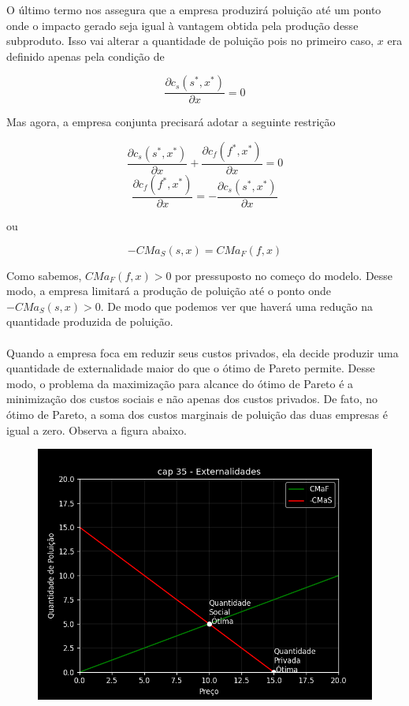 \documentclass[a4paper,11pt,oneside]{book}
\theoremstyle{definition}
\theoremstyle{break}
\begin{document}
O último termo nos assegura que a empresa produzirá poluição até um ponto onde o impacto gerado seja igual à vantagem obtida pela produção desse subproduto. Isso vai alterar a quantidade de poluição pois no primeiro caso, $x$ era definido apenas pela condição de 

$$ \frac{\partial c_s(s^*,x^*)}{\partial x} = 0 $$

Mas agora, a empresa conjunta precisará adotar a seguinte restrição

$$ \frac{\partial c_s(s^*,x^*)}{\partial x} + \frac{\partial c_f(f^*,x^*)}{\partial x}= 0 $$
$$\frac{\partial c_f(f^*,x^*)}{\partial x} = - \frac{\partial c_s(s^*,x^*)}{\partial x} $$

\begin{center}
	ou
\end{center}

$$ - CMa_S(s,x) = CMa_F(f,x) $$

Como sabemos, $CMa_F(f,x) > 0$ por pressuposto no começo do modelo. Desse modo, a empresa limitará a produção de poluição até o ponto onde $- CMa_S(s,x) > 0$. De modo que podemos ver que haverá uma redução na quantidade produzida de poluição.
\\
\\
Quando a empresa foca em reduzir seus custos privados, ela decide produzir uma quantidade de externalidade maior do que o ótimo de Pareto permite. Desse modo, o problema da maximização para alcance do ótimo de Pareto é a minimização dos custos sociais e não apenas dos custos privados. De fato, no ótimo de Pareto, a soma dos custos marginais de poluição das duas empresas é igual a zero. Observa a figura abaixo.

\begin{figure}[H]
	\centering
	\includegraphics[scale=0.7]{cap35_3-producao_externalidade.png}
\end{figure}
\end{document}
